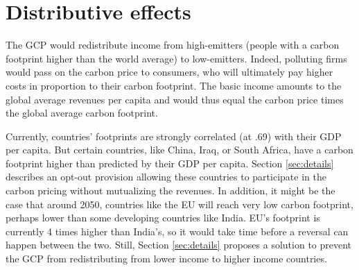 \documentclass[12pt,english]{article}
\begin{document}
% 



\section{Distributive effects}\label{sec:distribution}

The GCP would redistribute income from high-emitters (people with a carbon footprint higher than the world average) to low-emitters. Indeed, polluting firms would pass on the carbon price to consumers, who will ultimately pay higher costs in proportion to their carbon footprint. The basic income amounts to the global average revenues per capita and would thus equal the carbon price times the global average carbon footprint. 

Currently, countries' footprints are strongly correlated (at .69) with their GDP per capita. But certain countries, like China, Iraq, or South Africa, have a carbon footprint higher than predicted by their GDP per capita. Section \ref{sec:details} describes an opt-out provision allowing these countries to participate in the carbon pricing without mutualizing the revenues. In addition, it might be the case that around 2050, countries like the EU will reach very low carbon footprint, perhaps lower than some developing countries like India. EU's footprint is currently 4 times higher than India's, so it would take time before a reversal can happen between the two. Still, Section \ref{sec:details} proposes a solution to prevent the GCP from redistributing from lower income to higher income countries.
\end{document}
